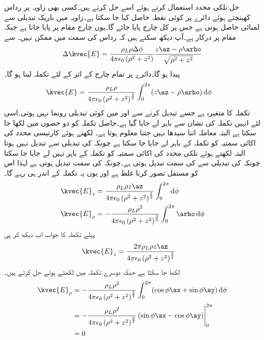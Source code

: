 حل:نلکی محدد استعمال کرتے ہوئے اسے حل کرتے ہیں۔کسی بھی زاویہ پر رداس کھینچتے ہوئے دائرے پر کوئی نقطہ حاصل کیا جا سکتا ہے۔زاویہ میں باریک تبدیلی  سے لمبائی  حاصل ہوتی ہے جس پر کل چارج  پایا جائے گا۔یوں چارج  مقام  پر پایا جاتا ہے جبکہ  مقام  پر درکار ہے۔آپ دیکھ سکتے ہیں کہ  رداس کی سمت میں ممکن نہیں۔ سے
\begin{align*}
\Delta \kvec{E}=\frac{\rho_L \rho \Delta \phi}{4\pi\epsilon_0 \left(\rho^2+z^2 \right)} \frac{z\az-\rho \arho}{\sqrt{\rho^2+z^2}}
\end{align*}
پیدا ہو گا۔دائرے پر تمام چارج کے اثر کے لئے تکملہ لینا ہو گا۔
\begin{align*}
\kvec{E}&=\frac{\rho_L \rho}{4\pi\epsilon_0  \left(\rho^2+z^2 \right)^{\frac{3}{2}}}\int_{0}^{2\pi}(z\az-\rho \arho) \dif \phi
\end{align*}
تکملہ کا متغیرہ  ہے جسے تبدیل کرنے سے  اور  میں کوئی تبدیلی رونما نہیں ہوتی۔اسی لئے انہیں تکملہ کی نشان سے باہر لے جایا گیا ہے۔حاصل تکملہ کو دو حصوں میں لکھا جا سکتا ہے البتہ معاملہ اتنا سیدھا نہیں جتنا معلوم ہوتا ہے۔ لکھتے ہوئے کارتیسی محدد کی اکائی سمتیہ  کو تکملہ کے باہر لے جایا جا سکتا ہے چونکہ  کی تبدیلی سے  تبدیل نہیں ہوتا البتہ   لکھتے ہوئے نلکی محدد کی اکائی سمتیہ  کو تکملہ کے باہر نہیں لے جایا جا سکتا چونکہ  کی تبدیلی سے   کی سمت تبدیل ہوتی ہے۔چونکہ  کی سمت تبدیل ہوتی ہے لہٰذا اس کو مستقل تصور کرنا غلط ہے اور یوں یہ تکملہ کے اندر ہی رہے گا۔ 
\begin{gather}
\begin{aligned}
\kvec{E}_z&=\frac{\rho_L \rho z \az}{4\pi\epsilon_0  \left(\rho^2+z^2 \right)^{\frac{3}{2}}}\int_{0}^{2\pi} \dif \phi\\
\kvec{E}_{\rho}&=-\frac{\rho_L \rho^2}{4\pi\epsilon_0  \left(\rho^2+z^2 \right)^{\frac{3}{2}}}\int_{0}^{2\pi} \arho \dif \phi
\end{aligned}
\end{gather}
پہلے تکملہ کا جواب اب دیکھ کر ہی
\begin{align}
\kvec{E}_z&=\frac{2\pi \rho_L \rho z \az}{4\pi\epsilon_0  \left(\rho^2+z^2 \right)^{\frac{3}{2}}}
\end{align}
لکھا جا سکتا ہے جبکہ دوسرے تکملہ میں  لکھتے ہوئے حل کرتے ہیں۔
\begin{align*}
\kvec{E}_{\rho}&=-\frac{\rho_L \rho^2}{4\pi\epsilon_0  \left(\rho^2+z^2 \right)^{\frac{3}{2}}}\int_{0}^{2\pi} (\cos \phi \ax+\sin \phi \ay) \dif \phi\\
&=-\frac{\rho_L \rho^2}{4\pi\epsilon_0  \left(\rho^2+z^2 \right)^{\frac{3}{2}}} \eval{ (\sin \phi \ax-\cos \phi \ay) }_{0}^{2\pi}\\
&=0
\end{align*}

